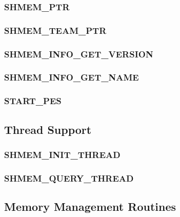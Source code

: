 \documentclass[10pt,oneside]{book}
\begin{document}
\subsubsection{\textbf{SHMEM\_PTR}}\label{subsec:shmem_ptr}


\subsubsection{\textbf{SHMEM\_TEAM\_PTR}}\label{subsec:shmem_team_ptr}


\subsubsection{\textbf{SHMEM\_INFO\_GET\_VERSION}}\label{subsec:shmem_info_get_version}


\subsubsection{\textbf{SHMEM\_INFO\_GET\_NAME}}\label{subsec:shmem_info_get_name}


\subsubsection{\textbf{START\_PES}}\label{subsec:start_pes}


\subsection{Thread Support}
\label{subsec:thread_support}


\subsubsection{\textbf{SHMEM\_INIT\_THREAD}}
\label{subsec:shmem_init_thread}


\subsubsection{\textbf{SHMEM\_QUERY\_THREAD}}
\label{subsec:shmem_query_thread}


\subsection{Memory Management Routines}
\label{sec:memory_management}

\end{document}
